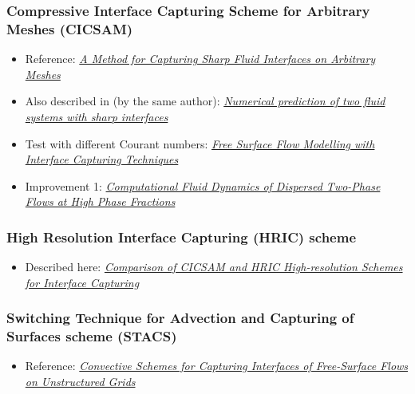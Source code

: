 \subsubsection{Compressive Interface Capturing Scheme for Arbitrary Meshes (CICSAM)}

\begin{itemize}
    \item Reference: \textit{\href{http://ac.els-cdn.com/S0021999199962769/1-s2.0-S0021999199962769-main.pdf?_tid=85161b57da5f4401e55c9d07495e24ea&acdnat=1336167249_a59e4f578adbacf3bff69936c48cdd57}{A Method for Capturing Sharp Fluid Interfaces on Arbitrary Meshes}}
    \item Also described in (by the same author): \textit{\href{http://powerlab.fsb.hr/ped/kturbo/OpenFOAM/docs/OnnoUbbinkPhD.pdf}{Numerical prediction of two fluid systems with sharp interfaces}}
    \item Test with different Courant numbers: \textit{\href{http://www.marin.nl/upload_mm/8/2/c/1807524470_1999999096_2007-ECCOMAS_HoekstraVazAbeilBunnik.pdf}{Free Surface Flow Modelling with Interface Capturing Techniques}}
    \item Improvement 1: \textit{\href{http://powerlab.fsb.hr/ped/kturbo/openfoam/docs/HenrikRuschePhD2002.pdf}{Computational Fluid Dynamics of Dispersed Two-Phase Flows at High Phase Fractions}}
\end{itemize}

\subsubsection{High Resolution Interface Capturing (HRIC) scheme}

\begin{itemize}
    \item Described here: \textit{\href{http://warminski.pollub.plwww.ptmts.org.pl/Waclaw-Koron-2-08.pdf}{Comparison of CICSAM and HRIC High-resolution Sche\-mes for Interface Capturing}}
\end{itemize}

\subsubsection{Switching Technique for Advection and Capturing of Surfaces scheme (STACS)}

\begin{itemize}
    \item Reference: \textit{\href{http://webfea-lb.fea.aub.edu.lb/cfd/pdfs/publications2/STACS-Complete.pdf}{Convective Schemes for Capturing Interfaces of Free-Surface Flows on Unstructured Grids}}
\end{itemize}

